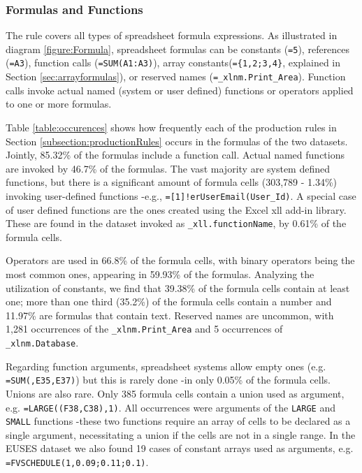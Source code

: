 \documentclass[conference]{IEEEtran}
\begin{document}
\subsubsection{Formulas and Functions}

The  rule covers all types of spreadsheet formula expressions. As illustrated in diagram \ref{figure:Formula}, spreadsheet formulas can be constants (\texttt{=5}), references (\texttt{=A3}), function calls (\texttt{=SUM(A1:A3)}), array constants(\texttt{=\{1,2;3,4\}}, explained in Section \ref{sec:arrayformulas}), or reserved names (\texttt{=_xlnm.Print_Area}). Function calls invoke actual named (system or user defined) functions or operators applied to one or more formulas.

Table \ref{table:occurences} shows how frequently each of the production rules in Section \ref{subsection:productionRules} occurs in the formulas of the two datasets. Jointly, 85.32\% of the formulas include a function call. Actual named functions are invoked by 46.7\% of the formulas. The vast majority are system defined functions, but there is a significant amount of formula cells (303,789 - 1.34\%) invoking user-defined functions -e.g., \texttt{=[1]!erUserEmail(User_Id)}. A special case of user defined functions are the ones created using the Excel xll add-in library. These are found in the dataset invoked as \texttt{_xll.functionName}, by 0.61\% of the formula cells.

Operators are used in 66.8\% of the formula cells, with binary operators being the most common ones, appearing in 59.93\% of the formulas. Analyzing the utilization of constants, we find that 39.38\% of the formula cells contain at least one; more than one third (35.2\%) of the formula cells contain a number and 11.97\% are formulas that contain text. Reserved names are uncommon, with 1,281 occurrences of the \texttt{_xlnm.Print_Area} and 5 occurrences of \texttt{_xlnm.Database}.

Regarding function arguments, spreadsheet systems allow empty ones (e.g. \texttt{=SUM(,E35,E37)}) but this is rarely done -in only 0.05\% of the formula cells. Unions are also rare. Only 385 formula cells contain a union used as argument, e.g. \texttt{=LARGE((F38,C38),1)}. All occurrences were arguments of the \texttt{LARGE} and \texttt{SMALL} functions -these two functions require an array of cells to be declared as a single argument, necessitating a union if the cells are not in a single range. In the EUSES dataset we also found 19 cases of constant arrays used as arguments, e.g. \texttt{=FVSCHEDULE(1,{0.09;0.11;0.1})}.
\end{document}

